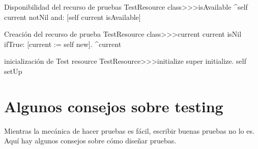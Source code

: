 \documentclass[a4paper,10pt,twoside]{book}
\begin{document}
\begin{method}[testresourceisavailable]{Disponibilidad del recurso de pruebas}
TestResource class>>>isAvailable
	^self current notNil and: [self current isAvailable]
\end{method}
\begin{method}[testresourcecurrent]{Creaci\'on del recurso de prueba}
TestResource class>>>current
	current isNil ifTrue: [current := self new].
	^current
\end{method}
\begin{method}[restresourceinitialize]{inicializaci\'on de Test resource }
TestResource>>>initialize
	super initialize.
	self setUp
\end{method}
\section{Algunos consejos sobre testing}

Mientras la mec\'anica de hacer pruebas es f\'acil, escribir buenas pruebas no lo es.
Aqu\'i hay algunos consejos sobre c\'omo dise\~nar pruebas.
\end{document}
